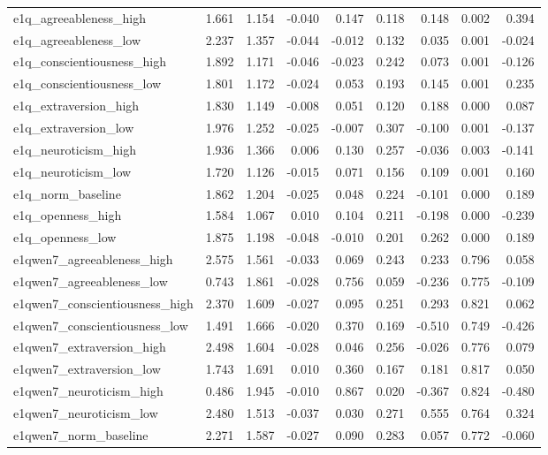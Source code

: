 \documentclass[11pt]{article}
\begin{document}
\begin{landscape}
\begin{longtable}{@{}lrrrrrrrr@{}}
e1q\_agreeableness\_high & 1.661 & 1.154 & -0.040 & 0.147 & 0.118 & 0.148 & 0.002 & 0.394 \\
e1q\_agreeableness\_low & 2.237 & 1.357 & -0.044 & -0.012 & 0.132 & 0.035 & 0.001 & -0.024 \\
e1q\_conscientiousness\_high & 1.892 & 1.171 & -0.046 & -0.023 & 0.242 & 0.073 & 0.001 & -0.126 \\
e1q\_conscientiousness\_low & 1.801 & 1.172 & -0.024 & 0.053 & 0.193 & 0.145 & 0.001 & 0.235 \\
e1q\_extraversion\_high & 1.830 & 1.149 & -0.008 & 0.051 & 0.120 & 0.188 & 0.000 & 0.087 \\
e1q\_extraversion\_low & 1.976 & 1.252 & -0.025 & -0.007 & 0.307 & -0.100 & 0.001 & -0.137 \\
e1q\_neuroticism\_high & 1.936 & 1.366 & 0.006 & 0.130 & 0.257 & -0.036 & 0.003 & -0.141 \\
e1q\_neuroticism\_low & 1.720 & 1.126 & -0.015 & 0.071 & 0.156 & 0.109 & 0.001 & 0.160 \\
e1q\_norm\_baseline & 1.862 & 1.204 & -0.025 & 0.048 & 0.224 & -0.101 & 0.000 & 0.189 \\
e1q\_openness\_high & 1.584 & 1.067 & 0.010 & 0.104 & 0.211 & -0.198 & 0.000 & -0.239 \\
e1q\_openness\_low & 1.875 & 1.198 & -0.048 & -0.010 & 0.201 & 0.262 & 0.000 & 0.189 \\
e1qwen7\_agreeableness\_high & 2.575 & 1.561 & -0.033 & 0.069 & 0.243 & 0.233 & 0.796 & 0.058 \\
e1qwen7\_agreeableness\_low & 0.743 & 1.861 & -0.028 & 0.756 & 0.059 & -0.236 & 0.775 & -0.109 \\
e1qwen7\_conscientiousness\_high & 2.370 & 1.609 & -0.027 & 0.095 & 0.251 & 0.293 & 0.821 & 0.062 \\
e1qwen7\_conscientiousness\_low & 1.491 & 1.666 & -0.020 & 0.370 & 0.169 & -0.510 & 0.749 & -0.426 \\
e1qwen7\_extraversion\_high & 2.498 & 1.604 & -0.028 & 0.046 & 0.256 & -0.026 & 0.776 & 0.079 \\
e1qwen7\_extraversion\_low & 1.743 & 1.691 & 0.010 & 0.360 & 0.167 & 0.181 & 0.817 & 0.050 \\
e1qwen7\_neuroticism\_high & 0.486 & 1.945 & -0.010 & 0.867 & 0.020 & -0.367 & 0.824 & -0.480 \\
e1qwen7\_neuroticism\_low & 2.480 & 1.513 & -0.037 & 0.030 & 0.271 & 0.555 & 0.764 & 0.324 \\
e1qwen7\_norm\_baseline & 2.271 & 1.587 & -0.027 & 0.090 & 0.283 & 0.057 & 0.772 & -0.060 \\

\end{longtable}
\end{landscape}
\end{document}

